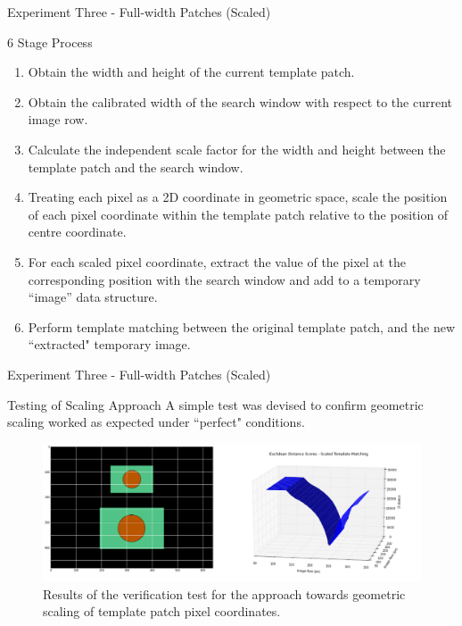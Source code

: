 \documentclass[10pt, compress]{beamer}
\begin{document}
\begin{frame}{Experiment Three - Full-width Patches (Scaled)}

\vspace{-5pt}
\begin{block}{6 Stage Process}
  \vspace{-5pt}
{\small \begin{enumerate}[label={\arabic*.}]
  \item Obtain the width and height of the current template patch.
  \item Obtain the calibrated width of the search window with respect to the current image row.
  \item Calculate the independent scale factor for the width and height between the template patch and the search window.
  \item Treating each pixel as a 2D coordinate in geometric space, scale the position of each pixel coordinate within the template patch relative to the position of centre coordinate.
  \item For each scaled pixel coordinate, extract the value of the pixel at the corresponding position with the search window and add to a temporary “image” data structure.
  \item Perform template matching between the original template patch, and the new ``extracted" temporary image.
 
\end{enumerate}}
	
\end{block}

\end{frame}


\begin{frame}{Experiment Three - Full-width Patches (Scaled)}
	
	\vspace{-5pt}
  \begin{block}{Testing of Scaling Approach} A simple test was devised to confirm geometric scaling worked as expected under ``perfect" conditions.
 \vspace{-15pt}
  		  \begin{figure}[ht!]
\centering
\includegraphics[scale=0.23]{scaling_verif}
 \caption{Results of the verification test for the approach towards geometric scaling of template patch pixel coordinates.}
\end{figure}
  		
  \end{block}


\end{frame}
\end{document}
